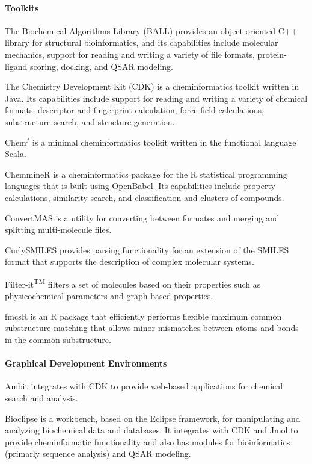 \paragraph{Toolkits}
The Biochemical Algorithms Library (BALL) \cite{Hildebrandt_2010} provides an object-oriented C++ library for structural bioinformatics, and its capabilities include molecular mechanics, support for reading and writing a variety of file formats, protein-ligand scoring, docking, and QSAR modeling.

The Chemistry Development Kit (CDK) \cite{Steinbeck_2006} is a cheminformatics toolkit written in Java.  Its capabilities include support for reading and writing a variety of chemical formats, descriptor and fingerprint calculation, force field calculations, substructure search, and structure generation.

Chem$^f$ \cite{H_ck_2012} is a minimal cheminformatics toolkit written in the functional language Scala.

ChemmineR \cite{Cao_2008}  is a cheminformatics package for the R statistical programming languages that is built using OpenBabel. Its capabilities include property calculations, similarity search, and classification and clusters of compounds.

ConvertMAS is a utility for converting between formates and merging and splitting multi-molecule files.

CurlySMILES \cite{Drefahl_2011} provides parsing functionality for an extension of the SMILES format that supports the description of complex molecular systems.

Filter-it\textsuperscript{TM} filters a set of molecules based on their properties such as physicochemical parameters and graph-based properties. 

fmcsR \cite{Goecks_2010} is an R package that efficiently performs flexible maximum common substructure matching that allows minor mismatches between atoms and bonds in the common substructure.

\paragraph{Graphical Development Environments}

Ambit \cite{Jeliazkova_2011} integrates with CDK to provide web-based applications for chemical search and analysis.

Bioclipse  \cite{Spjuth_2009} is a workbench, based on the Eclipse framework, for manipulating and analyzing biochemical data and databases. It integrates with CDK and Jmol to provide cheminformatic functionality and also has modules for bioinformatics (primarly sequence analysis) and QSAR modeling.

